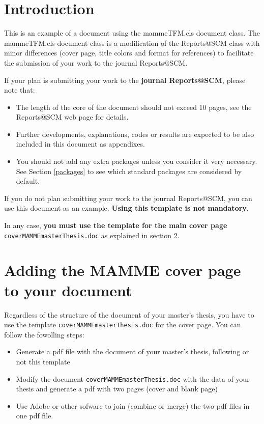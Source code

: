 \documentclass[12,twoside]{mammeTFM}
\theoremstyle{definition}
\theoremstyle{remark}
\begin{document}
\maketitle

\section{Introduction}

This is an example of a document using the mammeTFM.cls document class. The mammeTFM.cls document class is a modification of the Reports@SCM class with minor differences (cover page, title colors and format for references) to facilitate the submission of your work to the journal Reports@SCM.

If your plan is submitting your work to the \textbf{journal Reports@SCM}, please note that:
\begin{itemize}
	\item The length of the core of the document should not exceed 10 pages, see the Reports@SCM web page for details.
	\item Further developments, explanations, codes or results are expected to be also included in this document as appendixes.
	\item You should not add any extra packages unless you consider it very necessary. See Section \ref{packages} to see which standard packages  are considered by default. 
\end{itemize} 

If you do not plan submitting your work to the journal  Reports@SCM, you can use this document as an example. \textbf{Using this template is not mandatory}.
 
In any case, \textbf{you must use the template for the main cover page} \texttt{coverMAMMEmasterThesis.doc} as explained in section \ref{sec:coverPage}.

\section{Adding the MAMME cover page to your document}
\label{sec:coverPage}
  
Regardless of the structure of the document of your master's thesis, you have to use the template \texttt{coverMAMMEmasterThesis.doc} for the cover page. You can follow the fowolling steps:
\begin{itemize}
	\item Generate a pdf file with the document of your master's thesis, following or not this template
	\item Modify the document \texttt{coverMAMMEmasterThesis.doc} with the data of your thesis and generate a pdf with two pages (cover and blank page)
	\item Use Adobe or other sofware to join (combine or merge) the two pdf files in one pdf file. 
\end{itemize}
 
\end{document}
